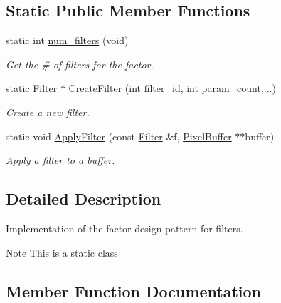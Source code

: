 \subsection*{Static Public Member Functions}
\begin{DoxyCompactItemize}
\item 
static int \hyperlink{classimage__tools_1_1FilterFactory_a6fbb1d1ceba2b8acdcd43f4bfabb068f}{num\+\_\+filters} (void)
\begin{DoxyCompactList}\small\item\em Get the \# of filters for the factor. \end{DoxyCompactList}\item 
static \hyperlink{classimage__tools_1_1Filter}{Filter} $\ast$ \hyperlink{classimage__tools_1_1FilterFactory_a3fae75057ee78eff06cf3187d0394eca}{Create\+Filter} (int filter\+\_\+id, int param\+\_\+count,...)
\begin{DoxyCompactList}\small\item\em Create a new filter. \end{DoxyCompactList}\item 
static void \hyperlink{classimage__tools_1_1FilterFactory_aac051c708b83acc6c32875308ebf3448}{Apply\+Filter} (const \hyperlink{classimage__tools_1_1Filter}{Filter} \&f, \hyperlink{classimage__tools_1_1PixelBuffer}{Pixel\+Buffer} $\ast$$\ast$buffer)
\begin{DoxyCompactList}\small\item\em Apply a filter to a buffer. \end{DoxyCompactList}\end{DoxyCompactItemize}


\subsection{Detailed Description}
Implementation of the factor design pattern for filters. 

\begin{DoxyNote}{Note}
This is a static class 
\end{DoxyNote}


\subsection{Member Function Documentation}
